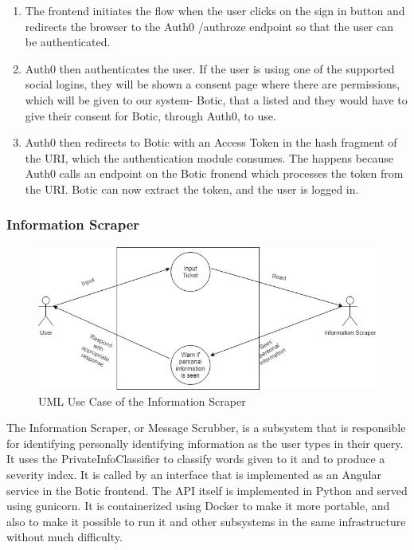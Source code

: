 \documentclass[11pt]{article}
\begin{document}
\begin{enumerate}
	\item The frontend initiates the flow when the user clicks on the sign in button and redirects the browser to the Auth0 			/authroze endpoint so that the user can be authenticated.
	\item Auth0 then authenticates the user. If the user is using one of the supported social logins, they will be shown a 			consent page where there are permissions, which will be given to our system- Botic, that a listed and they would have to 		give their consent for Botic, through Auth0, to use.
	\item Auth0 then redirects to Botic with an Access Token in the hash fragment of the URI, which the authentication 			module consumes. The happens because Auth0 calls an endpoint on the Botic fronend which processes the token from the 	URI. Botic can now extract the token, and the user is logged in.\cite{Website:1}
\end{enumerate}

\subsubsection{Information Scraper}

\begin{figure}[H]
	\centering
	\includegraphics[width=1.0\textwidth]{../../images/Information_Scraper_UCD.jpg}
	\caption{UML Use Case of the Information Scraper}
\end{figure}

The Information Scraper, or Message Scrubber, is a subsystem that is responsible for identifying personally identifying information as the user types in their query. It uses the PrivateInfoClassifier to classify words given to it and to produce a severity index. It is called by an interface that is implemented as an Angular service in the Botic frontend. The API itself is implemented in Python and served using gunicorn. It is containerized using Docker to make it more portable, and also to make it possible to run it and other subsystems in the same infrastructure without much difficulty.
\end{document}
